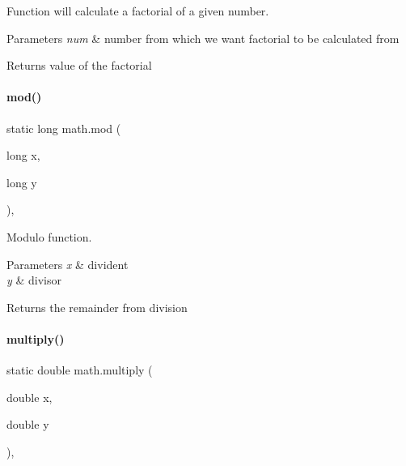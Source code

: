 Function will calculate a factorial of a given number. 


\begin{DoxyParams}{Parameters}
{\em num} & number from which we want factorial to be calculated from \\
\hline
\end{DoxyParams}
\begin{DoxyReturn}{Returns}
value of the factorial 
\end{DoxyReturn}
\mbox{\label{classmath_a66b6b2c231324eec1c7ccc3919e34768}} 
\paragraph{\texorpdfstring{mod()}{mod()}}
{\footnotesize\ttfamily static long math.\+mod (\begin{DoxyParamCaption}\item[{long}]{x,  }\item[{long}]{y }\end{DoxyParamCaption})\hspace{0.3cm}{\ttfamily [inline]}, {\ttfamily [static]}}



Modulo function. 


\begin{DoxyParams}{Parameters}
{\em x} & divident \\
\hline
{\em y} & divisor \\
\hline
\end{DoxyParams}
\begin{DoxyReturn}{Returns}
the remainder from division 
\end{DoxyReturn}
\mbox{\label{classmath_a2be9a72bde751de9d7b949d2b917d2b0}} 
\paragraph{\texorpdfstring{multiply()}{multiply()}\hspace{0.1cm}{\footnotesize\ttfamily [1/4]}}
{\footnotesize\ttfamily static double math.\+multiply (\begin{DoxyParamCaption}\item[{double}]{x,  }\item[{double}]{y }\end{DoxyParamCaption})\hspace{0.3cm}{\ttfamily [inline]}, {\ttfamily [static]}}



